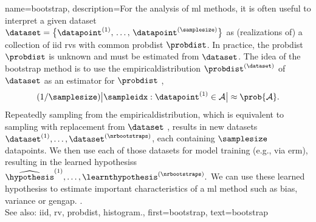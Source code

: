 {name={bootstrap},
	description={For the analysis of \gls{ml} methods, it is often 
	    useful to interpret a given \gls{dataset} $\dataset = \big\{ \datapoint^{(1)}, \,\ldots, \,\datapoint^{(\samplesize)}\big\}$ 
		as (\glspl{realization} of) a collection of \gls{iid} \glspl{rv} with 
		common \gls{probdist} $\probdist$. In practice, the \gls{probdist} $\probdist$ 
		is unknown and must be estimated from $\dataset$. The idea of the bootstrap 
		method is to use the \gls{empiricaldistribution} $\probdist^{(\dataset)}$ 
		of $\dataset$ as an estimator for $\probdist$ \cite{hastie01statisticallearning}, 
		$$ (1/\samplesize) \big| \sampleidx: \datapoint^{(1)} \in \mathcal{A} \big| \approx \prob{\mathcal{A}}.$$
		Repeatedly sampling from the \gls{empiricaldistribution}, which is equivalent 
		to sampling with replacement from $\dataset$ \cite{BoostrapBook}, 
		results in new \glspl{dataset} $\dataset^{(1)}, \ldots, \dataset^{(\nrbootstraps)}$, each containing 
		$\samplesize$ \glspl{datapoint}. We then use each of 
		those \glspl{dataset} for \gls{model} \gls{training} (e.g., via \gls{erm}), 
		resulting in the learned \glspl{hypothesis}
		$\widehat{\hypothesis}^{(1)}, \ldots, \learnthypothesis^{(\nrbootstraps)}.$ 
        We can use these learned \glspl{hypothesis} to estimate important characteristics 
		of a \gls{ml} method such as \gls{bias}, \gls{variance} or \gls{gengap}. \cite{hastie01statisticallearning}.
		\\
		See also: \gls{iid}, \gls{rv}, \gls{probdist}, \gls{histogram}.},
	first={bootstrap},
	text={bootstrap}  
}

